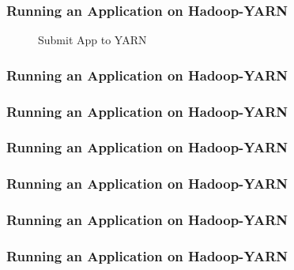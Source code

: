 \begin{frame}[c]{ }
	\frametitle{Running an Application on Hadoop-YARN }
		\begin{figure}
		\centering
		
		\caption{Submit App to YARN } \label{fig:yarn}
	\end{figure}
\end{frame}
\begin{frame}[c]{ }
	\frametitle{Running an Application on Hadoop-YARN }
	\begin{figure}
		\centering
		
	\end{figure}
\end{frame}
\begin{frame}[c]{ }
	\frametitle{Running an Application on Hadoop-YARN }
	\begin{figure}
		\centering
		
	\end{figure}
\end{frame}
\begin{frame}[c]{ }
	\frametitle{Running an Application on Hadoop-YARN }
	\begin{figure}
		\centering
		
	\end{figure}
\end{frame}
\begin{frame}[c]{ }
	\frametitle{Running an Application on Hadoop-YARN }
	\begin{figure}
		\centering
		
	\end{figure}
\end{frame}
\begin{frame}[c]{ }
	\frametitle{Running an Application on Hadoop-YARN }
	\begin{figure}
		\centering
		
	\end{figure}
\end{frame}
\begin{frame}[c]{ }
	\frametitle{Running an Application on Hadoop-YARN }
	\begin{figure}
		\centering
		
	\end{figure}
\end{frame}
